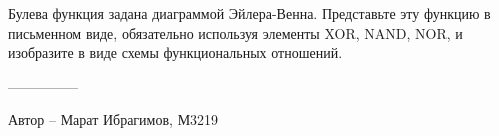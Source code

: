 \question
Булева функция задана диаграммой Эйлера-Венна. Представьте эту функцию в письменном виде, обязательно используя элементы XOR, NAND, NOR, и изобразите в виде схемы функциональных отношений.

\begin{figure}[h]

\begin{minipage}[h]{0.55\linewidth}
\end{minipage}
\begin{minipage}[h]{0.45\linewidth}
\end{minipage}
\end{figure}

---------------

Автор -- Марат Ибрагимов, М3219